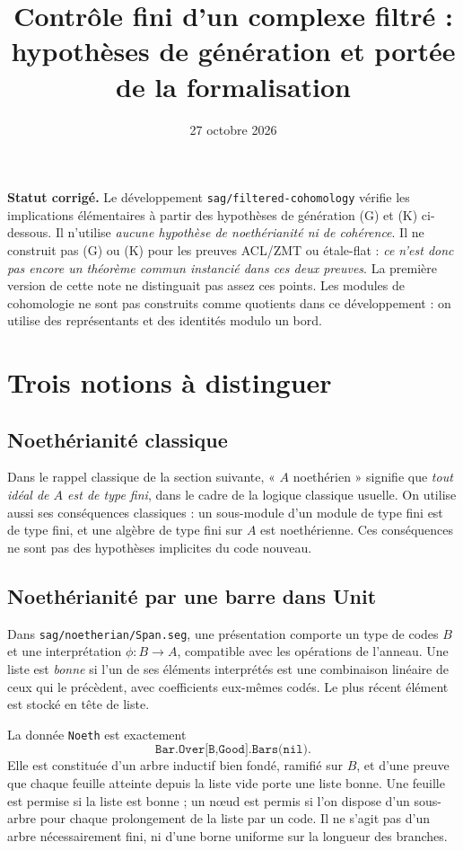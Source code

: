 \documentclass[11pt]{amsart}
\title[Contrôle filtré : hypothèses et formalisation]{Contrôle fini d'un complexe filtré :\protect\\
hypothèses de génération et portée de la formalisation}
\date{27 octobre 2026}
\begin{document}
\maketitle

\noindent\textbf{Statut corrigé.}
Le développement \texttt{sag/filtered-cohomology} vérifie les implications
élémentaires à partir des hypothèses de génération (G) et (K) ci-dessous.
Il n'utilise \emph{aucune hypothèse de noethérianité ni de cohérence}.
Il ne construit pas (G) ou (K) pour les preuves ACL/ZMT ou étale-flat :
\emph{ce n'est donc pas encore un théorème commun instancié dans ces
deux preuves}. La première version de cette note ne distinguait pas assez
ces points. Les modules de cohomologie ne sont pas construits comme
quotients dans ce développement : on utilise des représentants et des
identités modulo un bord.

\section{Trois notions à distinguer}

\subsection*{Noethérianité classique}
Dans le rappel classique de la section suivante, « $A$ noethérien »
signifie que \emph{tout idéal de $A$ est de type fini}, dans le cadre
de la logique classique usuelle. On utilise aussi ses conséquences
classiques : un sous-module d'un module de type fini est de type fini,
et une algèbre de type fini sur $A$ est noethérienne.
Ces conséquences ne sont pas des hypothèses implicites du code nouveau.

\subsection*{Noethérianité par une barre dans Unit}
Dans \texttt{sag/noetherian/Span.seg}, une présentation comporte un type
de codes $B$ et une interprétation $\phi:B\to A$, compatible avec les
opérations de l'anneau. Une liste est \emph{bonne} si l'un de ses éléments
interprétés est une combinaison linéaire de ceux qui le précèdent,
avec coefficients eux-mêmes codés. Le plus récent élément est stocké
en tête de liste.

La donnée \texttt{Noeth} est exactement
\[
 \texttt{Bar.Over[B,Good].Bars(nil)}.
\]
Elle est constituée d'un arbre inductif bien fondé, ramifié sur $B$,
et d'une preuve que chaque feuille atteinte depuis la liste vide
porte une liste bonne. Une feuille est permise si la liste est bonne ;
un nœud est permis si l'on dispose d'un sous-arbre pour chaque
prolongement de la liste par un code. Il ne s'agit pas d'un arbre
nécessairement fini, ni d'une borne uniforme sur la longueur des branches.
\end{document}
